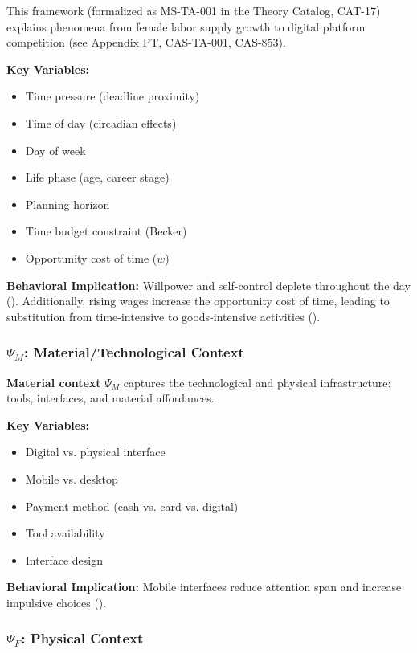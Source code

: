 This framework (formalized as MS-TA-001 in the Theory Catalog, CAT-17) explains
phenomena from female labor supply growth to digital platform competition
(see Appendix PT, CAS-TA-001, CAS-853).

\textbf{Key Variables:}
\begin{itemize}[nosep]
\item Time pressure (deadline proximity)
\item Time of day (circadian effects)
\item Day of week
\item Life phase (age, career stage)
\item Planning horizon
\item Time budget constraint (Becker)
\item Opportunity cost of time ($w$)
\end{itemize}

\textbf{Behavioral Implication:}
Willpower and self-control deplete throughout the day
(\citet{baumeister2007strength}). Additionally, rising wages increase
the opportunity cost of time, leading to substitution from time-intensive
to goods-intensive activities (\citet{PAP-becker1965theory}).

\subsubsection{$\Psi_M$: Material/Technological Context}

\begin{definition}
\textbf{Material context} $\Psi_M$ captures the technological and physical infrastructure:
tools, interfaces, and material affordances.
\end{definition}

\textbf{Key Variables:}
\begin{itemize}[nosep]
\item Digital vs. physical interface
\item Mobile vs. desktop
\item Payment method (cash vs. card vs. digital)
\item Tool availability
\item Interface design
\end{itemize}

\textbf{Behavioral Implication:}
Mobile interfaces reduce attention span and increase impulsive choices
(\citet{ghose2013mobile}).

\subsubsection{$\Psi_F$: Physical Context}

